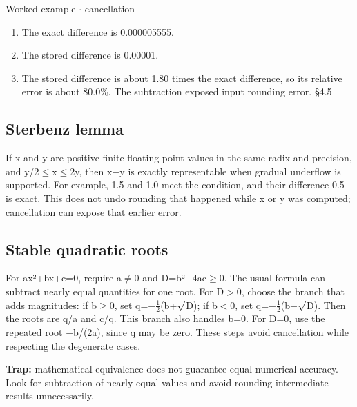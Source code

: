 \documentclass[11pt]{article}
\begin{document}
\begin{keepsection}
\begin{keepsection}
\begin{workedbox}{Worked example \ensuremath{\cdot} cancellation}
\begin{enumerate}
\item The exact difference is 0.000005555.
\item The stored difference is 0.00001.
\item The stored difference is about 1.80 times the exact difference, so its relative error is about 80.0\%. The subtraction exposed input rounding error. \hfill{\small\color{FAUblue}§4.5}
\end{enumerate}
\end{workedbox}
\end{keepsection}

\begin{keepsection}
\subsection{Sterbenz lemma}

If x and y are positive finite floating-point values in the same radix and precision, and y/2\ensuremath{\leq}x\ensuremath{\leq}2y, then x\ensuremath{-}y is exactly representable when gradual underflow is supported. For example, 1.5 and 1.0 meet the condition, and their difference 0.5 is exact. This does not undo rounding that happened while x or y was computed; cancellation can expose that earlier error.
\end{keepsection}

\begin{keepsection}
\subsection{Stable quadratic roots}

For ax²+bx+c=0, require a\ensuremath{\neq}0 and D=b²\ensuremath{-}4ac\ensuremath{\geq}0. The usual formula can subtract nearly equal quantities for one root. For D\ensuremath{>}0, choose the branch that adds magnitudes: if b\ensuremath{\geq}0, set q=\ensuremath{-}\ensuremath{\tfrac12}(b+\ensuremath{\surd}D); if b\ensuremath{<}0, set q=\ensuremath{-}\ensuremath{\tfrac12}(b\ensuremath{-}\ensuremath{\surd}D). Then the roots are q/a and c/q. This branch also handles b=0. For D=0, use the repeated root \ensuremath{-}b/(2a), since q may be zero. These steps avoid cancellation while respecting the degenerate cases.

\begin{notebox}\textbf{Trap:} mathematical equivalence does not guarantee equal numerical accuracy. Look for subtraction of nearly equal values and avoid rounding intermediate results unnecessarily.\end{notebox}


\end{keepsection}
\end{keepsection}
\end{document}
